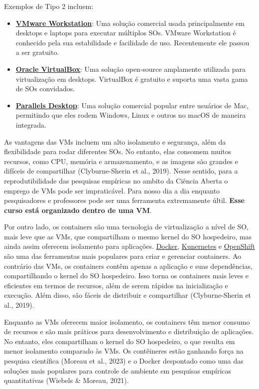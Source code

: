 \documentclass[
  a4paper,
]{article}
\begin{document}
Exemplos de Tipo 2 incluem:

\begin{itemize}
\item
  \href{https://www.vmware.com/products/desktop-hypervisor.html}{\textbf{VMware
  Workstation}}: Uma solução comercial usada principalmente em desktops
  e laptops para executar múltiplos SOs. VMware Workstation é conhecido
  pela sua estabilidade e facilidade de uso. Recentemente ele passou a
  ser gratuito.
\item
  \href{https://www.virtualbox.org/}{\textbf{Oracle VirtualBox}}: Uma
  solução open-source amplamente utilizada para virtualização em
  desktops. VirtualBox é gratuito e suporta uma vasta gama de SOs
  convidados.
\item
  \href{https://www.parallels.com/br/}{\textbf{Parallels Desktop}}: Uma
  solução comercial popular entre usuários de Mac, permitindo que eles
  rodem Windows, Linux e outros no macOS de maneira integrada.
\end{itemize}

As vantagens das VMs incluem um alto isolamento e segurança, além da
flexibilidade para rodar diferentes SOs. No entanto, elas consomem
muitos recursos, como CPU, memória e armazenamento, e as imagens são
grandes e difíceis de compartilhar (Clyburne-Sherin et al., 2019). Nesse
sentido, para a reprodutibilidade das pesquisas empíricas no ambito da
Ciência Aberta o emprego de VMs pode ser impraticável. Para nosso dia a
dia enquanto pesquisadores e professores pode ser uma ferramenta
extremamente últil. \textbf{Esse curso está organizado dentro de uma
VM}.

Por outro lado, os containers são uma tecnologia de virtualização a
nível de SO, mais leve que as VMs, que compartilham o mesmo kernel do SO
hospedeiro, mas ainda assim oferecem isolamento para aplicações.
\href{https://www.docker.com/}{Docker},
\href{https://kubernetes.io/}{Kunernetes} e
\href{https://www.redhat.com/en/technologies/cloud-computing/openshift}{OpenShift}
são uma das ferramentas mais populares para criar e gerenciar
containers. Ao contrário das VMs, os containers contêm apenas a
aplicação e suas dependências, compartilhando o kernel do SO hospedeiro.
Isso torna os containers mais leves e eficientes em termos de recursos,
além de serem rápidos na inicialização e execução. Além disso, são
fáceis de distribuir e compartilhar (Clyburne-Sherin et al., 2019).

Enquanto as VMs oferecem maior isolamento, os containers têm menor
consumo de recursos e são mais práticos para desenvolvimento e
distribuição de aplicações. No entanto, eles compartilham o kernel do SO
hospedeiro, o que resulta em menor isolamento comparado às VMs. Os
contêineres estão ganhando força na pesquisa científica (Moreau et al.,
2023) e o Docker despontado como uma das soluções mais populares para
controle de ambiente em pesquisas empíricas quantitativas (Wiebels \&
Moreau, 2021).
\end{document}

